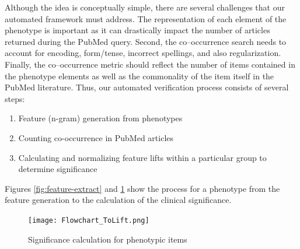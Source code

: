 \documentclass{sig-alternate-05-2015}
\begin{document}
Although the idea is conceptually simple, there are several challenges that our automated framework must address.
The representation of each element of the phenotype is important as it can drastically impact the number of articles returned during the PubMed query.
Second, the co--occurrence search needs to account for encoding, form/tense, incorrect spellings, and also regularization.
Finally, the co--occurrence metric should reflect the number of items contained in the phenotype elements as well as the commonality of the item itself in the PubMed literature.
Thus, our automated verification process consists of several steps:
\begin{enumerate}
\item Feature (n-gram) generation from phenotypes
\item Counting co-occurrence in PubMed articles
\item Calculating and normalizing feature lifts within a particular group to determine significance
\end{enumerate}
Figures \ref{fig:feature-extract} and \ref{fig:sig-calc} show the process for a phenotype from the feature generation to the calculation of the clinical significance.

\begin{figure} [t]
\centering
\texttt{[image: Flowchart\_ToLift.png]}
\caption{Significance calculation for phenotypic items}
\label{fig:sig-calc}
\end{figure}


\end{document}
